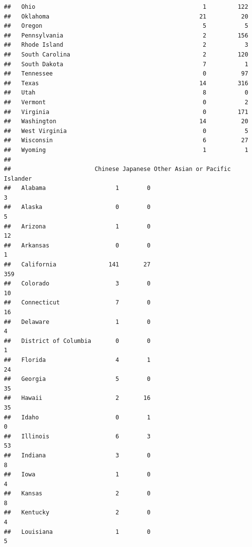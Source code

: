\documentclass[]{book}
\newenvironment{Shaded}{\begin{snugshade}}{\end{snugshade}}
\theoremstyle{definition}
\theoremstyle{definition}
\theoremstyle{definition}
\theoremstyle{remark}
\begin{document}
\begin{Shaded}
\begin{Highlighting}[]
\begin{Shaded}
\begin{Highlighting}[]
\begin{verbatim}
##   Ohio                                                1         122
##   Oklahoma                                           21          20
##   Oregon                                              5           5
##   Pennsylvania                                        2         156
##   Rhode Island                                        2           3
##   South Carolina                                      2         120
##   South Dakota                                        7           1
##   Tennessee                                           0          97
##   Texas                                              14         316
##   Utah                                                8           0
##   Vermont                                             0           2
##   Virginia                                            0         171
##   Washington                                         14          20
##   West Virginia                                       0           5
##   Wisconsin                                           6          27
##   Wyoming                                             1           1
##                       
##                        Chinese Japanese Other Asian or Pacific Islander
##   Alabama                    1        0                               3
##   Alaska                     0        0                               5
##   Arizona                    1        0                              12
##   Arkansas                   0        0                               1
##   California               141       27                             359
##   Colorado                   3        0                              10
##   Connecticut                7        0                              16
##   Delaware                   1        0                               4
##   District of Columbia       0        0                               1
##   Florida                    4        1                              24
##   Georgia                    5        0                              35
##   Hawaii                     2       16                              35
##   Idaho                      0        1                               0
##   Illinois                   6        3                              53
##   Indiana                    3        0                               8
##   Iowa                       1        0                               4
##   Kansas                     2        0                               8
##   Kentucky                   2        0                               4
##   Louisiana                  1        0                               5

\end{verbatim}
\end{Highlighting}
\end{Shaded}
\end{Highlighting}
\end{Shaded}
\end{document}
